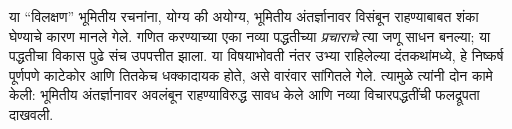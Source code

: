 \documentclass[../../../include/open-logic-section]{subfiles}
\begin{document}
या “विलक्षण” भूमितीय रचनांना, योग्य की अयोग्य, भूमितीय अंतर्ज्ञानावर विसंबून राहण्याबाबत शंका घेण्याचे कारण मानले गेले. गणित करण्याच्या एका नव्या पद्धतीच्या \emph{प्रचाराचे} त्या जणू साधन बनल्या; या पद्धतीचा विकास पुढे संच उपपत्तीत झाला. या विषयाभोवती नंतर उभ्या राहिलेल्या दंतकथांमध्ये, हे निष्कर्ष पूर्णपणे काटेकोर आणि तितकेच धक्कादायक होते, असे वारंवार सांगितले गेले. त्यामुळे त्यांनी दोन कामे केली: भूमितीय अंतर्ज्ञानावर अवलंबून राहण्याविरुद्ध सावध केले आणि नव्या विचारपद्धतींची फलद्रूपता दाखवली.
\end{document}
